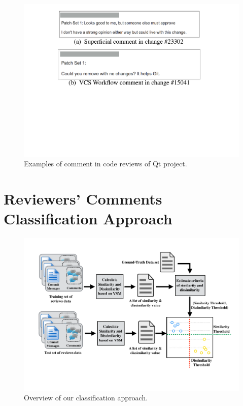 \documentclass[conference]{IEEEtran}
\begin{document}
\begin{figure}[!t]
\centering
\includegraphics[scale=0.4, trim= 100 250 0 0, clip=true]{comment_examples}
\caption{Examples of comment in code reviews of Qt project.}
\label{fig:example}
\end{figure}




\section{Reviewers' Comments Classification Approach}
\begin{figure}[!t]
\centering
\includegraphics[scale=0.35, trim = 50 90 0 30, clip=true]{overview2}
\caption{Overview of our classification approach.}
\label{fig:overview}
\end{figure}
\end{document}
